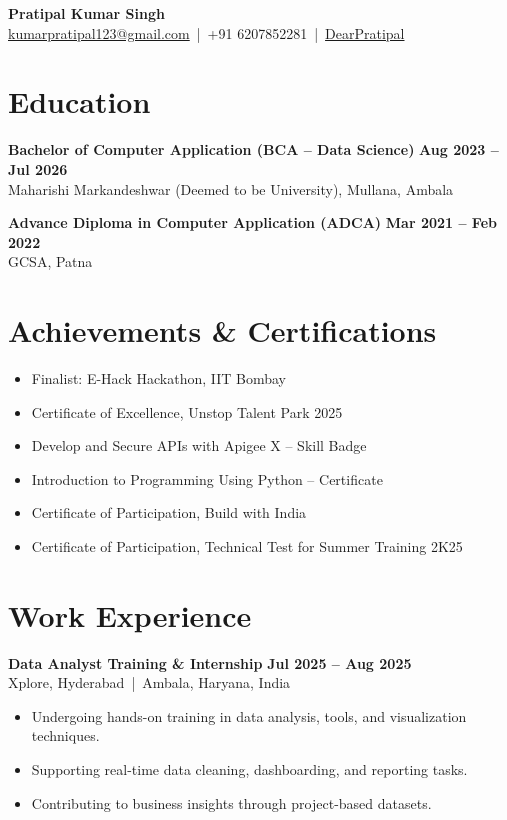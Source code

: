 \documentclass[11pt,a4paper]{article}
\begin{document}
{\Large \textbf{Pratipal Kumar Singh}} \\[4pt]
\href{mailto:kumarpratipal123@gmail.com}{kumarpratipal123@gmail.com} \,|\, 
+91 6207852281 \,|\, 
\href{https://github.com/DearPratipal}{DearPratipal}

\section*{Education}

\textbf{Bachelor of Computer Application (BCA – Data Science)} \hfill \textbf{Aug 2023 – Jul 2026} \\
Maharishi Markandeshwar (Deemed to be University), Mullana, Ambala

\textbf{Advance Diploma in Computer Application (ADCA)} \hfill \textbf{Mar 2021 – Feb 2022} \\
GCSA, Patna

\section*{Achievements \& Certifications}

\begin{itemize}[leftmargin=*]
\item Finalist: E-Hack Hackathon, IIT Bombay
\item Certificate of Excellence, Unstop Talent Park 2025
\item Develop and Secure APIs with Apigee X – Skill Badge
\item Introduction to Programming Using Python – Certificate
\item Certificate of Participation, Build with India
\item Certificate of Participation, Technical Test for Summer Training 2K25
\end{itemize}

\section*{Work Experience}

\textbf{Data Analyst Training \& Internship} \hfill \textbf{Jul 2025 – Aug 2025} \\
Xplore, Hyderabad \,|\, Ambala, Haryana, India
\begin{itemize}[leftmargin=*]
\item Undergoing hands-on training in data analysis, tools, and visualization techniques.
\item Supporting real-time data cleaning, dashboarding, and reporting tasks.
\item Contributing to business insights through project-based datasets.
\end{itemize}
\end{document}
